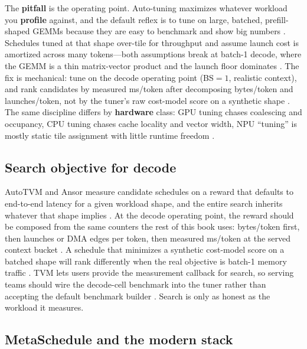 The \textbf{pitfall} is the operating point. Auto-tuning maximizes whatever workload you \textbf{profile} against, and the default reflex is to tune on large, batched, prefill-shaped GEMMs because they are easy to benchmark and show big numbers \citep{kwon2023vllm}. Schedules tuned at that shape over-tile for throughput and assume launch cost is amortized across many tokens---both assumptions break at batch-1 decode, where the GEMM is a thin matrix-vector product and the launch floor dominates \citep{taxbreak2026,memoryfloor2026}. The fix is mechanical: tune on the decode operating point (BS${=}1$, realistic context), and rank candidates by measured ms/token after decomposing bytes/token and launches/token, not by the tuner's raw cost-model score on a synthetic shape \citep{patel2025llminference,dlbook}. The same discipline differs by \textbf{hardware} class: GPU tuning chases coalescing and occupancy, CPU tuning chases cache locality and vector width, NPU ``tuning'' is mostly static tile assignment with little runtime freedom \citep{amd2024xdna,nvidia2022hopper}.

\subsection{Search objective for decode}

AutoTVM and Ansor measure candidate schedules on a reward that defaults to end-to-end latency for a given workload shape, and the entire search inherits whatever that shape implies \citep{chen2018autotvm,zheng2020ansor}. At the decode operating point, the reward should be composed from the same counters the rest of this book uses: bytes/token first, then launches or DMA edges per token, then measured ms/token at the served context bucket \citep{memoryfloor2026,taxbreak2026,patel2025llminference}. A schedule that minimizes a synthetic cost-model score on a batched shape will rank differently when the real objective is batch-1 memory traffic \citep{kwon2023vllm,dao2022flashattention}. TVM lets users provide the measurement callback for search, so serving teams should wire the decode-cell benchmark into the tuner rather than accepting the default benchmark builder \citep{chen2018autotvm,zheng2020ansor}. Search is only as honest as the workload it measures.

\subsection{MetaSchedule and the modern stack}

